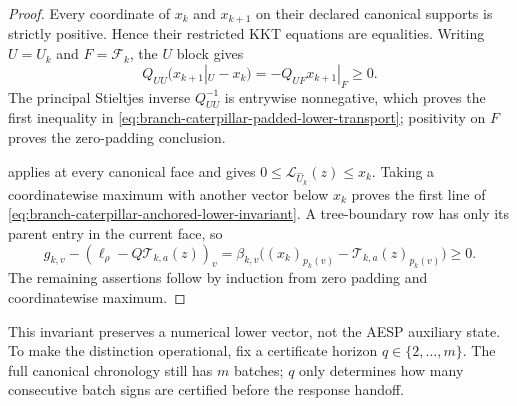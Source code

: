 \begin{proof}
Every coordinate of $x_k$ and $x_{k+1}$ on their declared canonical supports
is strictly positive.  Hence their restricted KKT equations are equalities.
Writing $U=\widehat U_k$ and $F=\mathcal F_k$, the $U$ block gives
\[
 Q_{UU}\bigl(x_{k+1}|_U-x_k\bigr)
 =-Q_{UF}x_{k+1}|_F\geq0.
\]
The principal Stieltjes inverse $Q_{UU}^{-1}$ is entrywise nonnegative, which
proves the first inequality in
\cref{eq:branch-caterpillar-padded-lower-transport}; positivity on $F$ proves
the zero-padding conclusion.

 applies at every
canonical face and gives
$0\leq\mathcal L_{\widehat U_k}(z)\leq x_k$.  Taking a coordinatewise maximum
with another vector below $x_k$ proves the first line of
\cref{eq:branch-caterpillar-anchored-lower-invariant}.  A tree-boundary row
has only its parent entry in the current face, so
\[
 g_{k,v}-(\ell_\rho-Q\mathcal T_{k,a}(z))_v
 =\beta_{k,v}\bigl((x_k)_{p_k(v)}
   -\mathcal T_{k,a}(z)_{p_k(v)}\bigr)\geq0.
\]
The remaining assertions follow by induction from zero padding and
coordinatewise maximum.
\end{proof}

This invariant preserves a numerical lower vector, not the AESP auxiliary
state.  To make the distinction operational, fix a certificate horizon
$q\in\{2,\ldots,m\}$.  The full canonical chronology still has $m$ batches;
$q$ only determines how many consecutive batch signs are certified before
the response handoff.

